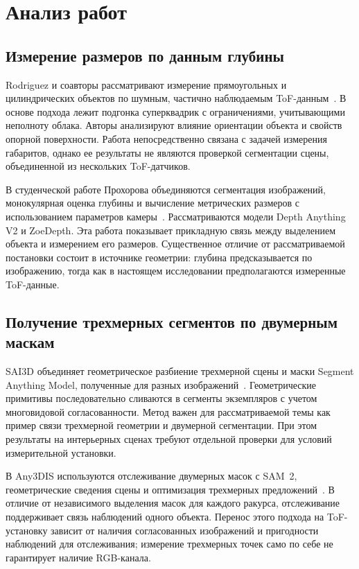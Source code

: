 \documentclass{misisarticle}
\begin{document}
\section{Анализ работ}

\subsection{Измерение размеров по данным глубины}

Rodriguez и соавторы рассматривают измерение прямоугольных и цилиндрических объектов по шумным, частично наблюдаемым ToF-данным~\cite{rodriguez2023}. В основе подхода лежит подгонка суперквадрик с ограничениями, учитывающими неполноту облака. Авторы анализируют влияние ориентации объекта и свойств опорной поверхности. Работа непосредственно связана с задачей измерения габаритов, однако ее результаты не являются проверкой сегментации сцены, объединенной из нескольких ToF-датчиков.

В студенческой работе Прохорова объединяются сегментация изображений, монокулярная оценка глубины и вычисление метрических размеров с использованием параметров камеры~\cite{prokhorov2026}. Рассматриваются модели Depth Anything V2 и ZoeDepth. Эта работа показывает прикладную связь между выделением объекта и измерением его размеров. Существенное отличие от рассматриваемой постановки состоит в источнике геометрии: глубина предсказывается по изображению, тогда как в настоящем исследовании предполагаются измеренные ToF-данные.

\subsection{Получение трехмерных сегментов по двумерным маскам}

SAI3D объединяет геометрическое разбиение трехмерной сцены и маски Segment Anything Model, полученные для разных изображений~\cite{yin2024}. Геометрические примитивы последовательно сливаются в сегменты экземпляров с учетом многовидовой согласованности. Метод важен для рассматриваемой темы как пример связи трехмерной геометрии и двумерной сегментации. При этом результаты на интерьерных сценах требуют отдельной проверки для условий измерительной установки.

В Any3DIS используются отслеживание двумерных масок с SAM~2, геометрические сведения сцены и оптимизация трехмерных предложений~\cite{nguyen2025}. В отличие от независимого выделения масок для каждого ракурса, отслеживание поддерживает связь наблюдений одного объекта. Перенос этого подхода на ToF-установку зависит от наличия согласованных изображений и пригодности наблюдений для отслеживания; измерение трехмерных точек само по себе не гарантирует наличие RGB-канала.
\end{document}
